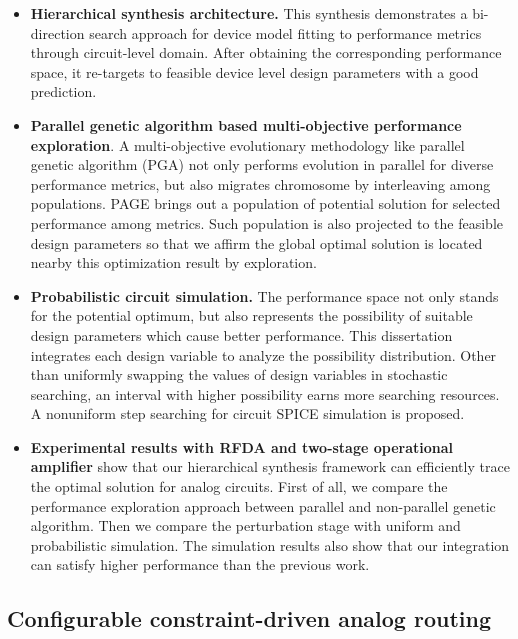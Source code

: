       \begin{itemize}
      \item {\bf Hierarchical synthesis architecture.} This synthesis demonstrates a bi-direction search approach for device model fitting to performance metrics through circuit-level domain. After obtaining the corresponding performance space, it re-targets to feasible device level design parameters with a good prediction.
      \item {\bf Parallel genetic algorithm based multi-objective performance exploration}. A multi-objective evolutionary methodology like parallel genetic algorithm (PGA) not only performs evolution in parallel for diverse performance metrics, but also migrates chromosome by interleaving among populations. PAGE brings out a population of potential solution for selected performance among metrics. Such population is also projected to the feasible design parameters so that we affirm the global optimal solution is located nearby this optimization result by exploration.
      \item {\bf Probabilistic circuit simulation.} The performance space not only stands for the potential optimum, but also represents the possibility of suitable design parameters which cause better performance. This dissertation integrates each design variable to analyze the possibility distribution. Other than uniformly swapping the values of design variables in stochastic searching, an interval with higher possibility earns more searching resources. A nonuniform step searching for circuit SPICE simulation is proposed.
      \item {\bf Experimental results with RFDA and two-stage operational amplifier} show that our hierarchical synthesis framework can efficiently trace the optimal solution for analog circuits. First of all, we compare the performance exploration approach between parallel and non-parallel genetic algorithm. Then we compare the perturbation stage with uniform and probabilistic simulation. The simulation results also show that our integration can satisfy higher performance than the previous work.
      \end{itemize}

    \subsection{Configurable constraint-driven analog routing}

